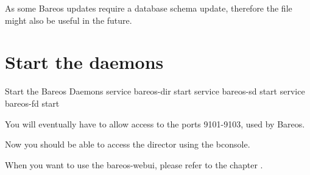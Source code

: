 As some Bareos updates require a database schema update,
therefore the file  might also be useful in the future.


\section{Start the daemons}
    \label{sec:StartDaemons}

\begin{commands}{Start the Bareos Daemons}
service bareos-dir start
service bareos-sd start
service bareos-fd start
\end{commands}

You will eventually have to allow access to the ports 9101-9103, used by Bareos.

Now you should be able to access the director using the bconsole.

When you want to use the bareos-webui, please refer to the chapter .
